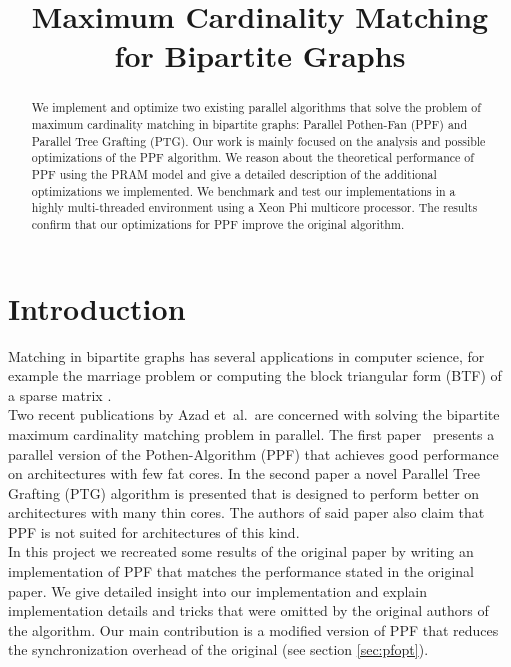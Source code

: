 \documentclass[letterpaper]{article}
\title{Maximum Cardinality Matching for Bipartite Graphs}
\begin{document}
%
\maketitle
%


\begin{abstract}

We implement and optimize two existing parallel algorithms that solve the problem of maximum cardinality matching in bipartite graphs: Parallel Pothen-Fan (PPF) and Parallel Tree Grafting (PTG). Our work is mainly focused on the analysis and possible optimizations of the PPF algorithm. We reason about the theoretical performance of PPF using the PRAM model and give a detailed description of the additional optimizations we implemented. We benchmark and test our implementations in a highly multi-threaded environment using a Xeon Phi multicore processor. The results confirm that our optimizations for PPF improve the original algorithm. 

\end{abstract}

\section{Introduction}\label{sec:intro}

Matching in bipartite graphs has several applications in computer science, for example the marriage problem or computing the block triangular 
form (BTF) of a sparse matrix \cite{Pothen:1990}.\\

Two recent publications by Azad et\ al.\ are concerned with solving the bipartite maximum cardinality matching problem in parallel. 
The first paper~\cite{Azad:2012} presents a parallel version of the Pothen-Algorithm (PPF) that achieves good performance 
on architectures with few fat cores. In the second paper a novel Parallel Tree Grafting (PTG) algorithm is presented 
that is designed to perform better on architectures with many thin cores. 
The authors of said paper also claim that PPF is not suited for architectures of this kind.\\

In this project we recreated some results of the original paper \cite{Azad:2012} by writing an implementation of PPF
that matches the performance stated in the original paper. We give detailed insight into our implementation and explain
implementation details and tricks that were omitted by the original authors of the algorithm. 
Our main contribution is a modified version of PPF that reduces the synchronization overhead of the original (see section \ref{sec:pfopt}).\\
\end{document}
